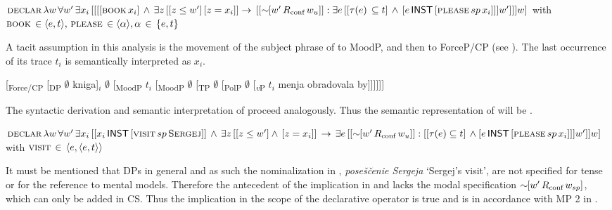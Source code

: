 \documentclass[output=paper,colorlinks,citecolor=brown]{langscibook}
\begin{document}
\begin{otherlanguage}{english}
\begin{exe}
\ex $ \textsc{declar} \, \lambda w \,  \forall w' \, \exists x_{i} \, [[[[\textsc{book} \, x_{i}] \, \wedge \, \exists z \, [[z \le w'] \, [z=x_{i}]]  
\newline
\to \, [[\sim \negthinspace \negthinspace [w' \, R_\text{conf} \, w_{u}]] : \newline
\exists e \, [[\tau (e) \, \subseteq t] \, \wedge \, [e \, \cnst{inst} \, [\textsc{please} \, sp \, x_{i}]]]w']]]w] $
\newline
with $\textsc{book} \, \in \langle e,t \rangle, \, \textsc{please} \, \in \langle \alpha \rangle, \alpha \, \in \, \{e, t\}   $
\label{ex:16:34}
\end{exe}

\noindent A tacit assumption in this analysis is the movement of the subject phrase of  to MoodP, and then to ForceP/CP (see ). The last occurrence of its trace $t_i$ is semantically interpreted as $x_i$.

\begin{exe}
\ex {} [\textsubscript{Force/CP} [\textsubscript{DP} $\emptyset$ kniga]$_i$ $\emptyset$ [\textsubscript{MoodP} $t_i$ [\textsubscript{MoodP} $\emptyset$ [\textsubscript{TP} $\emptyset$ [\textsubscript{PolP} $\emptyset$ [\textsubscript{\textit{v}P} $t_i$ menja obradovala by]]]]]]  \label{ex:16:35}
\end{exe}

\noindent The syntactic derivation and semantic interpretation of  proceed analogously. Thus the semantic representation of  will be .

\begin{exe}
\ex $\textsc{declar} \, \lambda w \, \forall w' \, \exists x_{i} \, [[x_{i} \, \cnst{inst} \, [\textsc{visit} \, sp \, \textsc{Sergej}]] \, \wedge \, \exists z \, [[z \le w'] 
\newline
\wedge \, [z=x_{i}]] \, \to \, \exists e \, [[\sim \negthinspace \negthinspace [w' \, R_\text{conf} \, w_{u}]] : [[\tau (e)  \subseteq t] \, \wedge \, \newline
[e \, \cnst{inst} \, [\textsc{please} \, sp \, x_{i}]]]w']]w]  $
\newline
with $ \textsc{visit} \, \in \, \langle e,  \langle e,t \rangle \rangle $ \label{ex:16:36}
\end{exe}

\noindent It must be mentioned that DPs in general and as such the nominalization in , \textit{poseščenie Sergeja} `Sergej's visit', are not specified for tense or for the reference to mental models. Therefore the antecedent of the implication in  and  lacks the modal specification $\sim \negthinspace \negthinspace [w' \, R_\text{conf} \, w_{sp}]$, which can only be added in CS. Thus the implication in the scope of the declarative operator is true and is in accordance with MP 2 in .


\end{otherlanguage}
\end{document}
